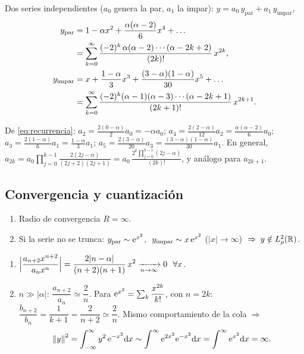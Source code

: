 \documentclass[11pt,a4paper,twoside]{article}
\begin{document}
Dos series independientes ($a_0$ genera la par, $a_1$ la impar): $y=a_0\,y_{\mathrm{par}}+a_1\,y_{\mathrm{impar}}$,
\begin{align}
y_{\mathrm{par}}&=1-\alpha x^2+\frac{\alpha(\alpha-2)}{6}x^4+\dots\notag\\
&=\sum_{k=0}^{\infty}\frac{(-2)^k\,\alpha(\alpha-2)\cdots(\alpha-2k+2)}{(2k)!}\,x^{2k},\label{eq:ypar}\\
y_{\mathrm{impar}}&=x+\frac{1-\alpha}{3}x^3+\frac{(3-\alpha)(1-\alpha)}{30}x^5+\dots\notag\\
&=\sum_{k=0}^{\infty}\frac{(-2)^k(\alpha-1)(\alpha-3)\cdots(\alpha-2k+1)}{(2k+1)!}\,x^{2k+1}.\label{eq:yimpar}
\end{align}

\begin{demostracion}[(coeficientes)]
De \eqref{eq:recurrencia}: $a_2=\frac{2(0-\alpha)}{2}a_0=-\alpha a_0$;
$a_4=\frac{2(2-\alpha)}{12}a_2=\frac{\alpha(\alpha-2)}{6}a_0$;
$a_3=\frac{2(1-\alpha)}{6}a_1=\frac{1-\alpha}{3}a_1$;
$a_5=\frac{2(3-\alpha)}{20}a_3=\frac{(3-\alpha)(1-\alpha)}{30}a_1$.
En general, $a_{2k}=a_0\prod_{j=0}^{k-1}\frac{2(2j-\alpha)}{(2j+2)(2j+1)}=a_0\,\frac{2^k\prod_{j=0}^{k-1}(2j-\alpha)}{(2k)!}$, y análogo para $a_{2k+1}$.
\end{demostracion}

\subsection{Convergencia y cuantización}

\begin{proposicion}
\begin{enumerate}[label=(\roman*)]
\item Radio de convergencia $R=\infty$.
\item Si la serie no se trunca: $y_{\mathrm{par}}\sim\mathrm{e}^{x^2}$, $\;y_{\mathrm{impar}}\sim x\,\mathrm{e}^{x^2}$ ($\lvert x\rvert\to\infty$) $\;\Rightarrow\; y\notin L^2_\rho(\mathbb{R})$.
\end{enumerate}
\end{proposicion}

\begin{demostracion}
\begin{enumerate}
\item[(i)] $\displaystyle\Bigl\lvert\frac{a_{n+2}x^{n+2}}{a_nx^n}\Bigr\rvert=\frac{2\lvert n-\alpha\rvert}{(n+2)(n+1)}\,x^2\xrightarrow[n\to\infty]{}0\ \ \forall x$.
\item[(ii)] $n\gg\lvert\alpha\rvert$: $\dfrac{a_{n+2}}{a_n}\simeq\dfrac{2}{n}$. Para $\mathrm{e}^{x^2}=\sum_k\dfrac{x^{2k}}{k!}$, con $n=2k$:
$\dfrac{b_{n+2}}{b_n}=\dfrac{1}{k+1}=\dfrac{2}{n+2}\simeq\dfrac{2}{n}$. Mismo comportamiento de la cola $\Rightarrow$
\[
\left\lVert y\right\rVert^2=\int_{-\infty}^{\infty}y^2\,\mathrm{e}^{-x^2}\mathrm{d} x\sim\int^{\infty}\mathrm{e}^{2x^2}\mathrm{e}^{-x^2}\mathrm{d} x=\int^{\infty}\mathrm{e}^{x^2}\mathrm{d} x=\infty .
\]
\end{enumerate}
\end{demostracion}
\end{document}

